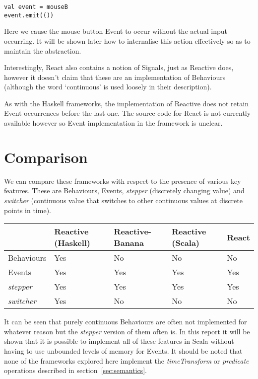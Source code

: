 \begin{verbatim}
val event = mouseB
event.emit(())
\end{verbatim}      

      Here we cause the mouse button Event to occur without the actual input occurring. It will be shown later how to     
      internalise this action effectively so as to maintain the abstraction. 

      Interestingly, React also contains a notion of Signals, just as Reactive does, 
      however it doesn't claim that these are an implementation of Behaviours (although the word `continuous' is
      used loosely in their description). 
      
      As with the Haskell frameworks, the implementation of Reactive does not retain Event occurrences before the
      last one. The source code for React is not currently available however so Event implementation in the framework is  
      unclear.
      
\section{Comparison}
  We can compare these frameworks with respect to the presence of various key features. These are Behaviours, Events, 
  \emph{stepper} (discretely 
  changing value) and \emph{switcher} (continuous value that switches to other continuous values at discrete points in time).
  
  \begin{center}
     \begin{tabular}{ | l | l | l | l | l | }
       \hline
        & Reactive (Haskell) & Reactive-Banana & Reactive (Scala) & React \\ \hline \hline
       Behaviours & Yes & No & No & No \\ \hline
       Events & Yes & Yes & Yes & Yes \\ \hline
       \emph{stepper} & Yes & Yes & Yes & Yes \\ \hline
       \emph{switcher} & Yes & No & No & No \\ \hline  
     \end{tabular}
   \end{center}
   
   It can be seen that purely continuous Behaviours are often not implemented for whatever reason
   but the \emph{stepper} version
   of them often is. In this report it will
   be shown that it is possible to implement all of these features in Scala without having to use unbounded levels
   of memory for Events. It should be noted that none of the frameworks explored here implement the \emph{timeTransform}
   or \emph{predicate} operations described in section~\ref{sec:semantics}.